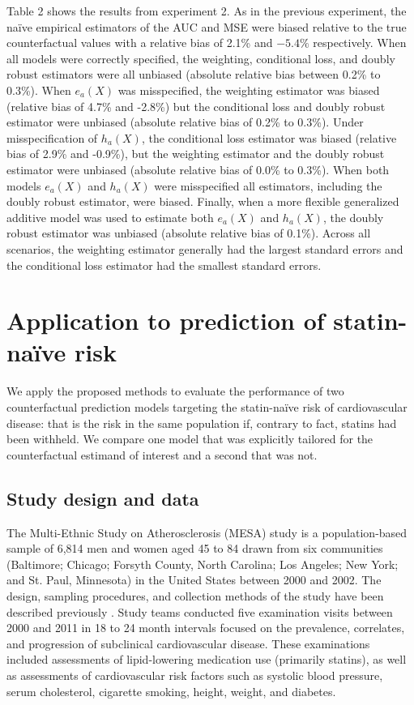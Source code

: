 Table 2 shows the results from experiment 2. As in the previous experiment, the na\"{i}ve empirical estimators of the AUC and MSE were biased relative to the true counterfactual values with a relative bias of 2.1\% and $-5.4\%$ respectively. When all models were correctly specified, the weighting, conditional loss, and doubly robust estimators were all unbiased (absolute relative bias between 0.2\% to 0.3\%). When $e_a(X)$ was misspecified, the weighting estimator was biased (relative bias of 4.7\% and -2.8\%) but the conditional loss and doubly robust estimator were unbiased (absolute relative bias of 0.2\% to 0.3\%). Under misspecification of $h_a(X)$, the conditional loss estimator was biased (relative bias of 2.9\% and -0.9\%), but the weighting estimator and the doubly robust estimator were unbiased (absolute relative bias of 0.0\% to 0.3\%). When both models $e_a(X)$ and $h_a(X)$ were misspecified all estimators, including the doubly robust estimator, were biased. Finally, when a more flexible generalized additive model was used to estimate both $e_a(X)$ and $h_a(X)$, the doubly robust estimator was unbiased (absolute relative bias of 0.1\%). Across all scenarios, the weighting estimator generally had the largest standard errors and the conditional loss estimator had the smallest standard errors.




\section{Application to prediction of statin-na\"{i}ve risk} \label{sec:results}

We apply the proposed methods to evaluate the performance of two counterfactual prediction models targeting the statin-na\"{i}ve risk of cardiovascular disease: that is the risk in the same population if, contrary to fact, statins had been withheld. We compare one model that was explicitly tailored for the counterfactual estimand of interest and a second that was not. 

\subsection{Study design and data}
The Multi-Ethnic Study on Atherosclerosis (MESA) study is a population-based sample of 6,814 men and women aged 45 to 84 drawn from six communities (Baltimore; Chicago; Forsyth County, North Carolina; Los Angeles; New York; and St. Paul, Minnesota) in the United States between 2000 and 2002. The design, sampling procedures, and collection methods of the study have been described previously \cite{bild_multi-ethnic_2002}. Study teams conducted five examination visits between 2000 and 2011 in 18 to 24 month intervals focused on the prevalence, correlates, and progression of subclinical cardiovascular disease. These examinations included assessments of lipid-lowering medication use (primarily statins), as well as assessments of cardiovascular risk factors such as systolic blood pressure, serum cholesterol, cigarette smoking, height, weight, and diabetes. 

